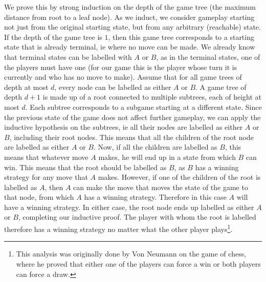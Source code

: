 \documentclass[12pt]{report}
\begin{document}
We prove this by strong induction on the depth of the game tree (the maximum distance from root to a leaf node). As we induct, we consider gameplay starting not just from the original starting state, but from any arbitrary (reachable) state. If the depth of the game tree is $1$, then this game tree corresponds to a starting state that is already terminal, ie where no move can be made. We already know that terminal states can be labelled with $A$ or $B$, as in the terminal states, one of the players must have one (for our game this is the player whose turn it is currently and who has no move to make). Assume that for all game trees of depth at most $d$, every node can be labelled as either $A$ or $B$. A game tree of depth $d + 1$ is made up of a root connected to multiple subtrees, each of height at most $d$. Each subtree corresponds to a subgame starting at a different state. Since the previous state of the game does not affect further gameplay, we can apply the inductive hypothesis on the subtrees, ie all their nodes are labelled as either $A$ or $B$, including their root nodes. This means that all the children of the root node are labelled as either $A$ or $B$. Now, if all the children are labelled as $B$, this means that whatever move $A$ makes, he will end up in a state from which $B$ can win. This means that the root should be labelled as $B$, as $B$ has a winning strategy for any move that $A$ makes. However, if one of the children of the root is labelled as $A$, then $A$ can make the move that moves the state of the game to that node, from which $A$ has a winning strategy. Therefore in this case $A$ will have a winning strategy. In either case, the root node ends up labelled as either $A$ or $B$, completing our inductive proof. The player with whom the root is labelled therefore has a winning strategy no matter what the other player plays\footnote{This analysis was originally done by Von Neumann on the game of chess, where he proved that either one of the players can force a win or both players can force a draw.}.

\end{document}
